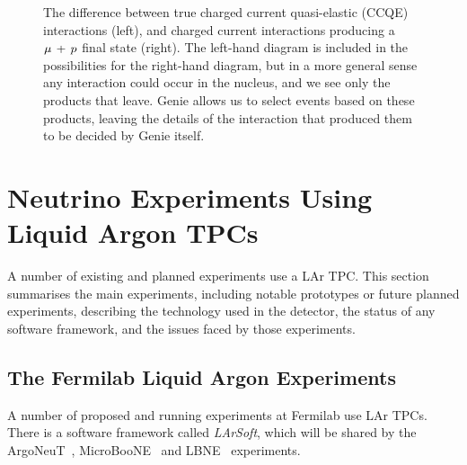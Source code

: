 \begin{figure}
\centering
{}
\caption[Charged current neutrino interactions producing a $\ccqe$ final state]{\label{fig:feynman-cc}The difference between true charged current quasi-elastic (CCQE) interactions (left), and charged current interactions producing a $\ccqe$ final state (right). The left-hand diagram is included in the possibilities for the right-hand diagram, but in a more general sense any interaction could occur in the nucleus, and we see only the products that leave. Genie allows us to select events based on these products, leaving the details of the interaction that produced them to be decided by Genie itself.}
\end{figure}

\section{Neutrino Experiments Using Liquid Argon TPCs}
A number of existing and planned experiments use a \acs{LAr TPC}. This section summarises the main experiments, including notable prototypes or future planned experiments, describing the technology used in the detector, the status of any software framework, and the issues faced by those experiments.

\subsection{The Fermilab Liquid Argon Experiments}
A number of proposed and running experiments at Fermilab use \acs{LAr TPC}s. There is a software framework called \emph{LArSoft}, which will be shared by the ArgoNeuT~\citep{ArgoNeuT}, MicroBooNE~\citep{MicroBooNE} and LBNE~\citep{LBNE} experiments.

